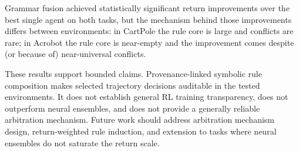 \documentclass[12pt]{article}
\begin{document}
Grammar fusion achieved statistically significant return improvements
over the best single agent on both tasks, but the mechanism behind those
improvements differs between environments: in CartPole the rule core is
large and conflicts are rare; in Acrobot the rule core is near-empty and
the improvement comes despite (or because of) near-universal conflicts.

These results support bounded claims.
Provenance-linked symbolic rule composition makes selected trajectory
decisions auditable in the tested environments.
It does not establish general RL training transparency, does not
outperform neural ensembles, and does not provide a generally reliable
arbitration mechanism.
Future work should address arbitration mechanism design, return-weighted
rule induction, and extension to tasks where neural ensembles do not
saturate the return scale.
\end{document}
